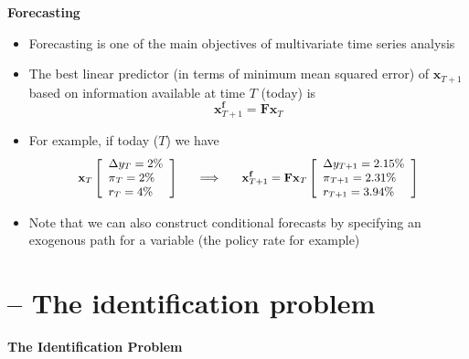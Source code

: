 \documentclass[10pt,handout]{beamer}
\begin{document}
\vspace{.1cm}

\begin{frame}
{\textbf{Forecasting}}

\begin{itemize}
\item Forecasting is one of the main objectives of multivariate time series
analysis\medskip \pause

\item The best linear predictor (in terms of minimum mean squared error) of $%
\mathbf{x}_{T+1}$ based on information available at time $T$ (today) is%
\begin{equation*}
\mathbf{x}_{T+1}^{\mathbf{f}}=\mathbf{Fx}_{T}
\end{equation*}%
\pause

\item For example, if today ($T$) we have 
\begin{equation*}
{\small 
\begin{array}{c}
\mathbf{x}_{T}\left[ 
\begin{array}{l}
\Delta y_{T}=2\% \\ 
\pi _{T}=2\% \\ 
r_{T}=4\%%
\end{array}%
\right] \ \ \ \ \ \Longrightarrow \ \ \ \ \ \mathbf{x}_{T+1}^{\mathbf{f}}=%
\mathbf{Fx}_{T}\left[ 
\begin{array}{l}
\Delta y_{T+1}=2.15\% \\ 
\pi _{T+1}=2.31\% \\ 
r_{T+1}=3.94\%%
\end{array}%
\right] 
\end{array}%
}
\end{equation*}

\item Note that we can also construct conditional forecasts by specifying an
exogenous path for a variable (the policy rate for example)
\end{itemize}
\end{frame}

\vspace{.1cm}

\section{ -- The identification problem}

\begin{frame}
\color{title} \centering \Large%
\textbf{The Identification Problem}
\end{frame}
\end{document}
